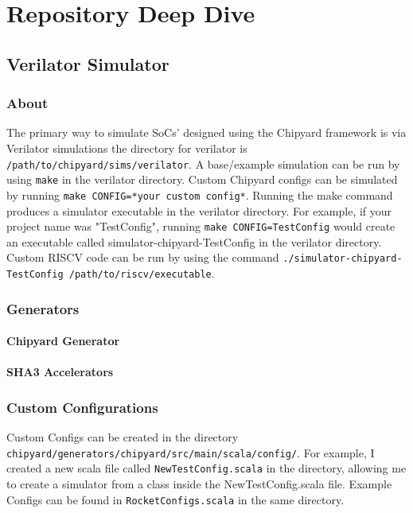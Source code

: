 \documentclass[oneside]{book}
\newcommand{\file}[1]{\texttt{#1}}
\begin{document}
	
	\chapter{Repository Deep Dive}
	\section{Verilator Simulator}
	\subsection{About}
	The primary way to simulate SoCs' designed using the Chipyard framework is via Verilator simulations the directory for verilator is \texttt{/path/to/chipyard/sims/verilator}.
	A base/example simulation can be run by using \texttt{make} in the verilator directory.
	Custom Chipyard configs can be simulated by running \texttt{make CONFIG=*your custom config*}.
	Running the make command produces a simulator executable in the verilator directory.
	For example, if your project name was "TestConfig", running \texttt{make CONFIG=TestConfig} would create an executable called simulator-chipyard-TestConfig in the verilator directory.
	Custom RISCV code can be run by using the command \texttt{./simulator-chipyard-TestConfig /path/to/riscv/executable}. 
	\subsection{Generators}
	\subsubsection{Chipyard Generator}
	\subsubsection{SHA3 Accelerators}
	
	\subsection{Custom Configurations}
	Custom Configs can be created in the directory \texttt{chipyard/generators/chipyard/src/main/scala/config/}.
	For example, I created a new scala file called \file{NewTestConfig.scala} in the directory, allowing me to create a simulator from a class inside the NewTestConfig.scala file.
	Example Configs can be found in  \file{RocketConfigs.scala} in the same directory.
	
\end{document}
